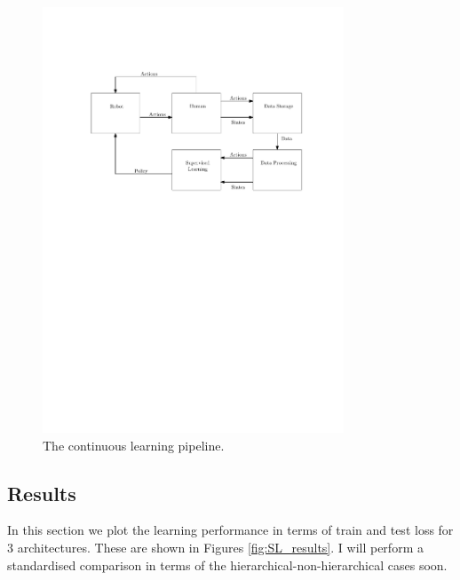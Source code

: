\documentclass[a4paper,11pt]{report}
\begin{document}
	
	\begin{figure}
	\centering
	    \includegraphics[width=0.8\textwidth]{figures/pipeline.pdf}
	  \caption[Pipeline]{The continuous learning pipeline.}
	  \label{fig:pipeline}
	\end{figure}


\subsection{Results}
In this section we plot the learning performance in terms of train and test loss for 3 architectures. These are shown in Figures \ref{fig:SL_results}. I will perform a standardised comparison in terms of the hierarchical-non-hierarchical cases soon.
\end{document}
